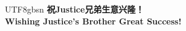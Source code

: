 \documentclass[12pt,a4paper]{article}
\begin{document}
\vspace{2cm}

\begin{center}
\begin{CJK}{UTF8}{gbsn}
\textbf{\Huge 祝Justice兄弟生意兴隆！}\\[0.5cm]
\textbf{\Large Wishing Justice's Brother Great Success!}
\end{CJK}
\end{center}
\end{document}
